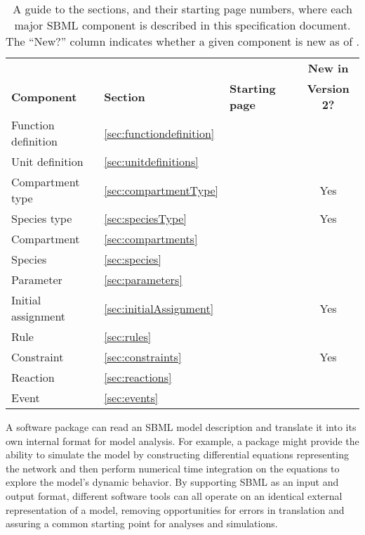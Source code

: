 \begin{table}[b]
  \small
  \centering
  \begin{tabular}{lllc}
    \toprule
                        &                               &                               & \textbf{New in}\\
    \textbf{Component}  & \textbf{Section}              & \textbf{Starting page}        & \textbf{Version 2?}\\
    \midrule
    Function definition & \ref{sec:functiondefinition}  & \pageref{sec:functiondefinition}\\
    Unit definition     & \ref{sec:unitdefinitions}     & \pageref{sec:unitdefinitions}\\
    Compartment type    & \ref{sec:compartmentType}     & \pageref{sec:compartmentType} & Yes\\
    Species type        & \ref{sec:speciesType}         & \pageref{sec:speciesType}     & Yes\\
    Compartment         & \ref{sec:compartments}        & \pageref{sec:compartments}\\
    Species             & \ref{sec:species}             & \pageref{sec:species}\\
    Parameter           & \ref{sec:parameters}          & \pageref{sec:parameters}\\
    Initial assignment  & \ref{sec:initialAssignment}   & \pageref{sec:initialAssignment} & Yes\\
    Rule                & \ref{sec:rules}               & \pageref{sec:rules}\\
    Constraint          & \ref{sec:constraints}         & \pageref{sec:constraints}     & Yes\\
    Reaction            & \ref{sec:reactions}           & \pageref{sec:reactions}\\
    Event               & \ref{sec:events}              & \pageref{sec:events}\\
    \bottomrule
  \end{tabular}
  \caption{A guide to the sections, and their starting page numbers, where
    each major SBML component is described in this specification document.
    The ``New?'' column indicates whether a given component is new as of
    \sbmltwotwo.}
  \label{tab:sections}
\end{table}

A software package can read an SBML model description and
translate it into its own internal format for model analysis.  For
example, a package might provide the ability to simulate the model
by constructing differential equations representing the network
and then perform numerical time integration on the equations to
explore the model's dynamic behavior.  By supporting SBML as an
input and output format, different software tools can all operate
on an identical external representation of a model, removing
opportunities for errors in translation and assuring a common
starting point for analyses and simulations.
